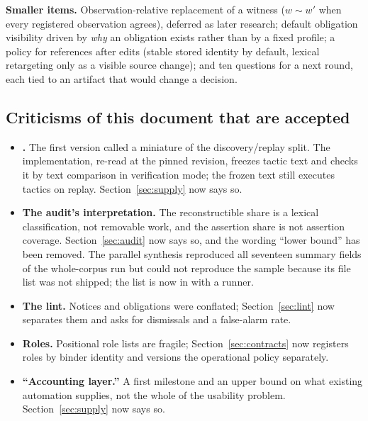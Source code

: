 \documentclass[11pt,a4paper]{article}
\newcommand{\code}[1]{\texttt{\detokenize{#1}}}
\theoremstyle{definition}
\begin{document}
\textbf{Smaller items.} Observation-relative replacement of a witness ($w\sim w'$ when every registered observation agrees), deferred as later research; default obligation visibility driven by \emph{why} an obligation exists rather than by a fixed profile; a policy for references after edits (stable stored identity by default, lexical retargeting only as a visible source change); and ten questions for a next round, each tied to an artifact that would change a decision.

\subsection{Criticisms of this document that are accepted}
\begin{itemize}
\item \textbf{\code{says}.} The first version called \code{says} a miniature of the discovery/replay split. The implementation, re-read at the pinned revision, freezes tactic text and checks it by text comparison in verification mode; the frozen text still executes tactics on replay. Section~\ref{sec:supply} now says so.
\item \textbf{The audit's interpretation.} The reconstructible share is a lexical classification, not removable work, and the assertion share is not assertion coverage. Section~\ref{sec:audit} now says so, and the wording ``lower bound'' has been removed. The parallel synthesis reproduced all seventeen summary fields of the whole-corpus run but could not reproduce the sample because its file list was not shipped; the list is now in \code{tools/sample_manifest.txt} with a runner.
\item \textbf{The lint.} Notices and obligations were conflated; Section~\ref{sec:lint} now separates them and asks for dismissals and a false-alarm rate.
\item \textbf{Roles.} Positional role lists are fragile; Section~\ref{sec:contracts} now registers roles by binder identity and versions the operational policy separately.
\item \textbf{``Accounting layer.''} A first milestone and an upper bound on what existing automation supplies, not the whole of the usability problem. Section~\ref{sec:supply} now says so.
\end{itemize}
\end{document}
